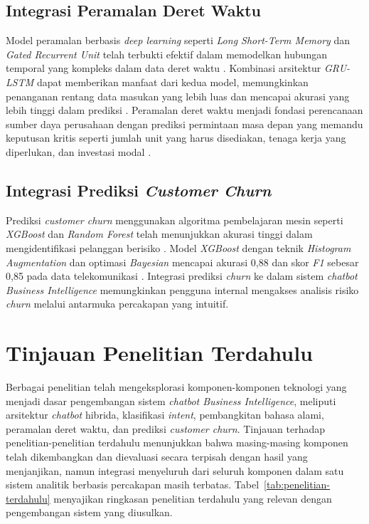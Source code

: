 \subsection{Integrasi Peramalan Deret Waktu}

Model peramalan berbasis \textit{deep learning} seperti \textit{Long Short-Term Memory} dan \textit{Gated Recurrent Unit} telah terbukti efektif dalam memodelkan hubungan temporal yang kompleks dalam data deret waktu \autocite{priadinata2025lstm}. Kombinasi arsitektur \textit{GRU-LSTM} dapat memberikan manfaat dari kedua model, memungkinkan penanganan rentang data masukan yang lebih luas dan mencapai akurasi yang lebih tinggi dalam prediksi \autocite{ejournal2024grulstm}. Peramalan deret waktu menjadi fondasi perencanaan sumber daya perusahaan dengan prediksi permintaan masa depan yang memandu keputusan kritis seperti jumlah unit yang harus disediakan, tenaga kerja yang diperlukan, dan investasi modal \autocite{databricks2025timeseries}.

\subsection{Integrasi Prediksi \textit{Customer Churn}}

Prediksi \textit{customer churn} menggunakan algoritma pembelajaran mesin seperti \textit{XGBoost} dan \textit{Random Forest} telah menunjukkan akurasi tinggi dalam mengidentifikasi pelanggan berisiko \autocite{jerr2024churnprediction}. Model \textit{XGBoost} dengan teknik \textit{Histogram Augmentation} dan optimasi \textit{Bayesian} mencapai akurasi 0,88 dan skor \textit{F1} sebesar 0,85 pada data telekomunikasi \autocite{ui2024churnhat}. Integrasi prediksi \textit{churn} ke dalam sistem \textit{chatbot Business Intelligence} memungkinkan pengguna internal mengakses analisis risiko \textit{churn} melalui antarmuka percakapan yang intuitif.

\section{Tinjauan Penelitian Terdahulu}

Berbagai penelitian telah mengeksplorasi komponen-komponen teknologi yang menjadi dasar pengembangan sistem \textit{chatbot Business Intelligence}, meliputi arsitektur \textit{chatbot} hibrida, klasifikasi \textit{intent}, pembangkitan bahasa alami, peramalan deret waktu, dan prediksi \textit{customer churn}. Tinjauan terhadap penelitian-penelitian terdahulu menunjukkan bahwa masing-masing komponen telah dikembangkan dan dievaluasi secara terpisah dengan hasil yang menjanjikan, namun integrasi menyeluruh dari seluruh komponen dalam satu sistem analitik berbasis percakapan masih terbatas. Tabel~\ref{tab:penelitian-terdahulu} menyajikan ringkasan penelitian terdahulu yang relevan dengan pengembangan sistem yang diusulkan.

